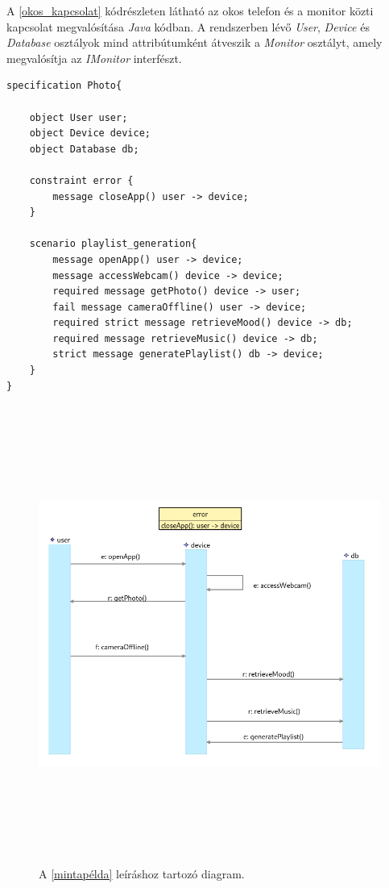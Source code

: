 A \ref{okos_kapcsolat} kódrészleten látható az okos telefon és a monitor közti kapcsolat megvalósítása \textit{Java} kódban.
A rendszerben lévő \textit{User}, \textit{Device} és \textit{Database} osztályok mind attribútumként átveszik a \textit{Monitor} osztályt, amely megvalósítja az \textit{IMonitor} interfészt.

\begin{lstlisting}[frame=single, float=ht!, caption={Okos telefon működésére megadott szcenárió követelmény.},captionpos=b, label=mintapélda]
specification Photo{

	object User user;
	object Device device;
	object Database db;

	constraint error {
		message closeApp() user -> device;
	}

	scenario playlist_generation{
		message openApp() user -> device;
		message accessWebcam() device -> device;
		required message getPhoto() device -> user;
		fail message cameraOffline() user -> device;
		required strict message retrieveMood() device -> db;
		required message retrieveMusic() device -> db;
		strict message generatePlaylist() db -> device;
	}
}
\end{lstlisting}

\begin{figure}[!ht]
    \centering
    \includegraphics[width=180mm, height= 15cm, keepaspectratio]{figures/monitor_device_visualisation_diagram.png}
    \caption{A \ref{mintapélda} leíráshoz tartozó diagram.}
	\label{monitor_visualisation}
\end{figure}

